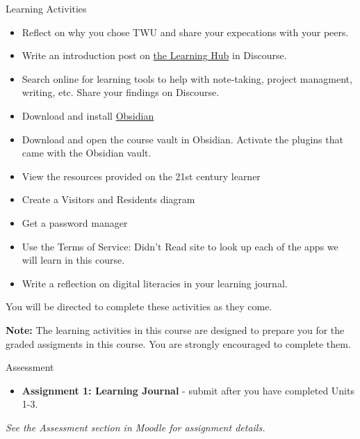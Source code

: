 \documentclass[
]{book}
\providecommand{\tightlist}{%
  \setlength{\itemsep}{0pt}\setlength{\parskip}{0pt}}
\theoremstyle{definition}
\theoremstyle{definition}
\theoremstyle{definition}
\theoremstyle{definition}
\theoremstyle{remark}
\begin{document}
\begin{reflect}
{Learning Activities}

\begin{itemize}
\tightlist
\item
  Reflect on why you chose TWU and share your expecations with your peers.
\item
  Write an introduction post on \href{https://twu.discourse.group}{the Learning Hub} in Discourse.\\
\item
  Search online for learning tools to help with note-taking, project managment, writing, etc. Share your findings on Discourse.
\item
  Download and install \href{https://obsidian.md}{Obsidian}\\
\item
  Download and open the course vault in Obsidian. Activate the plugins that came with the Obsidian vault.\\
\item
  View the resources provided on the 21st century learner
\item
  Create a Visitors and Residents diagram\\
\item
  Get a password manager\\
\item
  Use the Terms of Service: Didn't Read site to look up each of the apps we will learn in this course.
\item
  Write a reflection on digital literacies in your learning journal.
\end{itemize}

You will be directed to complete these activities as they come.

\textbf{Note:} The learning activities in this course are designed to prepare you for the graded assigments in this course. You are strongly encouraged to complete them.
\end{reflect}

\begin{assessment}
{Assessment}

\begin{itemize}
\tightlist
\item
  \textbf{Assignment 1: Learning Journal} - submit after you have completed Units 1-3.
\end{itemize}

\emph{See the Assessment section in Moodle for assignment details.}
\end{assessment}
\end{document}
